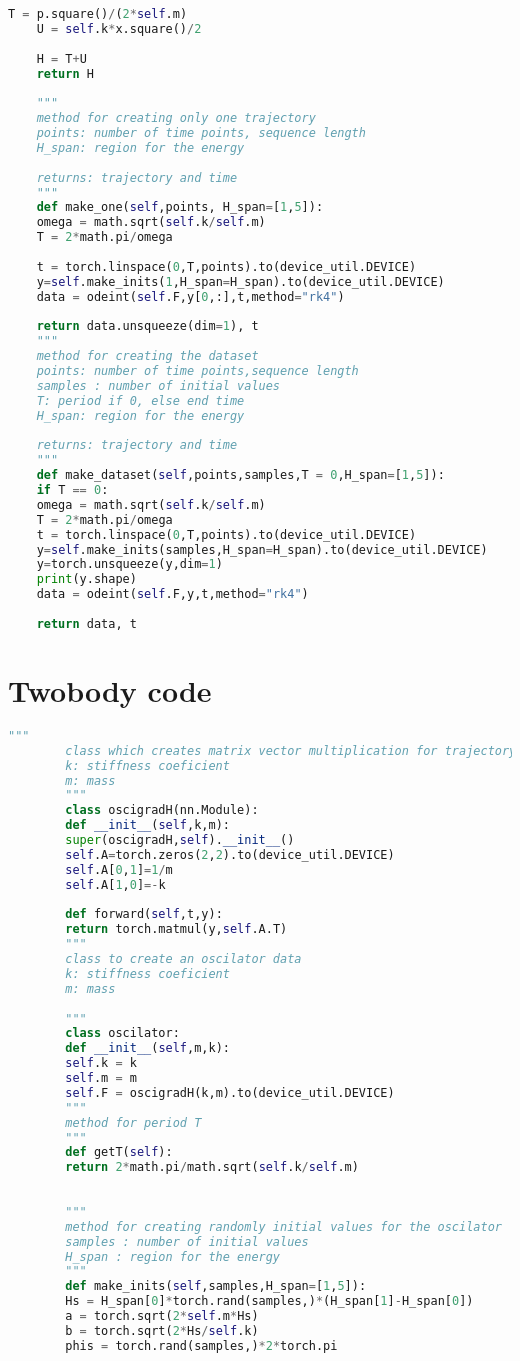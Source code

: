 \begin{appendices}
\begin{lstlisting}[language=Python, caption={ocilator.py}]
	T = p.square()/(2*self.m)
	U = self.k*x.square()/2
	
	H = T+U
	return H
	
	"""
	method for creating only one trajectory
	points: number of time points, sequence length
	H_span: region for the energy
	
	returns: trajectory and time
	"""
	def make_one(self,points, H_span=[1,5]):
	omega = math.sqrt(self.k/self.m)
	T = 2*math.pi/omega
	
	t = torch.linspace(0,T,points).to(device_util.DEVICE)
	y=self.make_inits(1,H_span=H_span).to(device_util.DEVICE)
	data = odeint(self.F,y[0,:],t,method="rk4")
	
	return data.unsqueeze(dim=1), t
	"""
	method for creating the dataset 
	points: number of time points,sequence length
	samples : number of initial values
	T: period if 0, else end time
	H_span: region for the energy
	
	returns: trajectory and time
	"""
	def make_dataset(self,points,samples,T = 0,H_span=[1,5]):
	if T == 0:
	omega = math.sqrt(self.k/self.m)
	T = 2*math.pi/omega
	t = torch.linspace(0,T,points).to(device_util.DEVICE)
	y=self.make_inits(samples,H_span=H_span).to(device_util.DEVICE)
	y=torch.unsqueeze(y,dim=1)
	print(y.shape)
	data = odeint(self.F,y,t,method="rk4")
	
	return data, t
\end{lstlisting}
	
	\section{Twobody code}
	\begin{lstlisting}[language=Python, caption={ocilator.py}]
		"""
		class which creates matrix vector multiplication for trajectory rollout
		k: stiffness coeficient
		m: mass
		"""
		class oscigradH(nn.Module):
		def __init__(self,k,m):
		super(oscigradH,self).__init__()
		self.A=torch.zeros(2,2).to(device_util.DEVICE)
		self.A[0,1]=1/m
		self.A[1,0]=-k
		
		def forward(self,t,y):
		return torch.matmul(y,self.A.T)
		"""
		class to create an oscilator data
		k: stiffness coeficient
		m: mass
		
		"""    
		class oscilator:
		def __init__(self,m,k):
		self.k = k
		self.m = m
		self.F = oscigradH(k,m).to(device_util.DEVICE)
		"""
		method for period T
		"""
		def getT(self):
		return 2*math.pi/math.sqrt(self.k/self.m)
		
		
		"""
		method for creating randomly initial values for the oscilator
		samples : number of initial values
		H_span : region for the energy
		"""	
		def make_inits(self,samples,H_span=[1,5]):
		Hs = H_span[0]*torch.rand(samples,)*(H_span[1]-H_span[0])
		a = torch.sqrt(2*self.m*Hs)
		b = torch.sqrt(2*Hs/self.k)
		phis = torch.rand(samples,)*2*torch.pi
		

\end{lstlisting}
\end{appendices}
